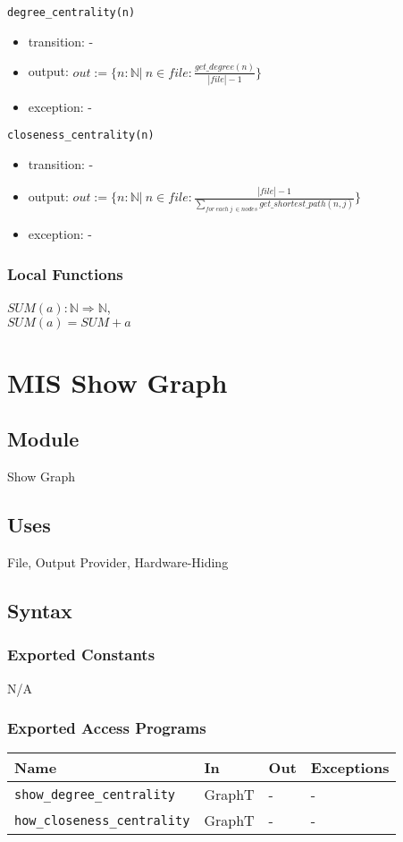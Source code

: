 \documentclass[12pt, titlepage]{article}
\begin{document}
\noindent \texttt{degree\_centrality(n)}
\begin{itemize}
\item transition: -
\item output: $out:=\{n: \mathbb{N}|\ n \in file : \frac{get\_degree(n)}{|file| - 1} \} $
\item exception: - 
\end{itemize}

\noindent \texttt{closeness\_centrality(n)}
\begin{itemize}
\item transition: -
\item output: $out:=\{n: \mathbb{N}|\ n \in file : \frac{|file|- 1}{\sum_{for\ each\ j\ \in nodes}{get\_shortest\_path(n,j)}} \} $
\item exception: - 
\end{itemize}

\subsubsection{Local Functions}

$SUM(a):  \mathbb{N} \Rightarrow \mathbb{N}$,\\
   $SUM(a)=SUM + a$

\newpage

\section{MIS Show Graph} \label{Module} 


\subsection{Module}
Show Graph

\subsection{Uses}
File, Output Provider, Hardware-Hiding
\subsection{Syntax}

\subsubsection{Exported Constants}
N/A
\subsubsection{Exported Access Programs}
\begin{center}
\begin{tabular}{|p{6cm}|p{2.5cm}|p{2.5cm}|p{4cm}|}
\hline
\textbf{Name} & \textbf{In} & \textbf{Out} & \textbf{Exceptions} \\
\hline
\texttt{show\_degree\_centrality} & GraphT& - & - \\
\texttt{how\_closeness\_centrality} & GraphT & - & - \\
\hline
\end{tabular}
\end{center}
\end{document}
